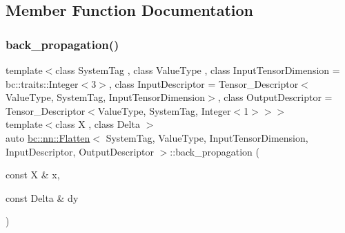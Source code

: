\subsection{Member Function Documentation}
\mbox{\label{structbc_1_1nn_1_1Flatten_aec50c8f60d24fbac0cbd9fe98d4a3d1d}} 
\subsubsection{\texorpdfstring{back\+\_\+propagation()}{back\_propagation()}}
{\footnotesize\ttfamily template$<$class System\+Tag , class Value\+Type , class Input\+Tensor\+Dimension  = bc\+::traits\+::\+Integer$<$3$>$, class Input\+Descriptor  = Tensor\+\_\+\+Descriptor$<$\+Value\+Type, System\+Tag, Input\+Tensor\+Dimension$>$, class Output\+Descriptor  = Tensor\+\_\+\+Descriptor$<$\+Value\+Type, System\+Tag, Integer$<$1$>$$>$$>$ \\
template$<$class X , class Delta $>$ \\
auto \hyperlink{structbc_1_1nn_1_1Flatten}{bc\+::nn\+::\+Flatten}$<$ System\+Tag, Value\+Type, Input\+Tensor\+Dimension, Input\+Descriptor, Output\+Descriptor $>$\+::back\+\_\+propagation (\begin{DoxyParamCaption}\item[{const X \&}]{x,  }\item[{const Delta \&}]{dy }\end{DoxyParamCaption})\hspace{0.3cm}{\ttfamily [inline]}}

\mbox{\label{structbc_1_1nn_1_1Flatten_af1e268a0fbb0cd6a6ccd7bfc5f9ca234}} 
